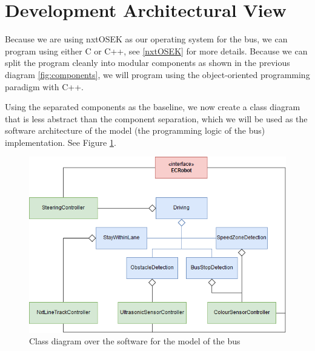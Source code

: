 \section{Development Architectural View}

Because we are using nxtOSEK as our operating system for the bus, we can program using either C or C++, see \ref{nxtOSEK} for more details. Because we can split the program cleanly into modular components as shown in the previous diagram \ref{fig:components}, we will program using the object-oriented programming paradigm with C++. 

Using the separated components as the baseline, we now create a class diagram that is less abstract than the component separation, which we will be used as the software architecture of the model (the programming logic of the bus) implementation. See Figure \ref{fig:softwareArchitecture}. %

\begin{figure}[ht]
    \includegraphics[width=\textwidth]{Images/Design/designClassDiagram.png}
    \caption{Class diagram over the software for the model of the bus}
    \label{fig:softwareArchitecture}
\end{figure}



